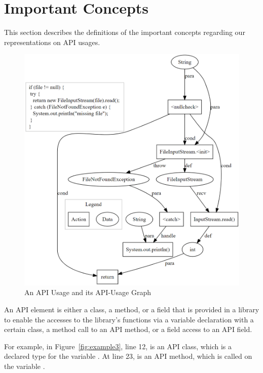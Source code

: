 \section{Important Concepts}
\label{sec:concepts}

This section describes the definitions of the important concepts
regarding our representations on API usages.

\begin{figure}[t] %
	\centering
	\includegraphics[width=0.9\linewidth]{aug-example}
        \vspace{-3pt}
	\caption{An API Usage and its API-Usage Graph}
	\label{fig:aug}
\end{figure}

\begin{Definition}
  An API element is either a class, a method, or a field that is
  provided in a library to enable the accesses to the library's
  functions via a variable declaration with a certain class, a method
  call to an API method, or a field access to an API field.
\end{Definition}

For example, in Figure~\ref{fig:example3}, line 12,  is
an API class, which is a declared type for the variable
. At line 23,  is an API
method, which is called on the variable .

